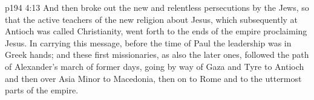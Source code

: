 \vs p194 4:13 And then broke out the new and relentless persecutions by the Jews, so that the active teachers of the new religion about Jesus, which subsequently at Antioch was called Christianity, went forth to the ends of the empire proclaiming Jesus. In carrying this message, before the time of Paul the leadership was in Greek hands; and these first missionaries, as also the later ones, followed the path of Alexander’s march of former days, going by way of Gaza and Tyre to Antioch and then over Asia Minor to Macedonia, then on to Rome and to the uttermost parts of the empire.
